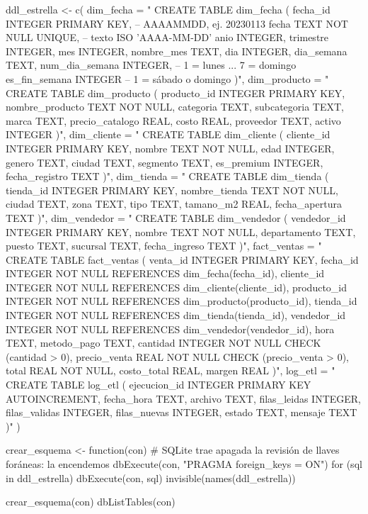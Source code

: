 \begin{rcode}
ddl_estrella <- c(
  dim_fecha = "
    CREATE TABLE dim_fecha (
      fecha_id       INTEGER PRIMARY KEY,  -- AAAAMMDD, ej. 20230113
      fecha          TEXT NOT NULL UNIQUE, -- texto ISO 'AAAA-MM-DD'
      anio           INTEGER, trimestre INTEGER, mes INTEGER,
      nombre_mes     TEXT, dia INTEGER, dia_semana TEXT,
      num_dia_semana INTEGER,              -- 1 = lunes ... 7 = domingo
      es_fin_semana  INTEGER               -- 1 = sábado o domingo
    )",
  dim_producto = "
    CREATE TABLE dim_producto (
      producto_id INTEGER PRIMARY KEY, nombre_producto TEXT NOT NULL,
      categoria TEXT, subcategoria TEXT, marca TEXT,
      precio_catalogo REAL, costo REAL, proveedor TEXT, activo INTEGER
    )",
  dim_cliente = "
    CREATE TABLE dim_cliente (
      cliente_id INTEGER PRIMARY KEY, nombre TEXT NOT NULL,
      edad INTEGER, genero TEXT, ciudad TEXT, segmento TEXT,
      es_premium INTEGER, fecha_registro TEXT
    )",
  dim_tienda = "
    CREATE TABLE dim_tienda (
      tienda_id INTEGER PRIMARY KEY, nombre_tienda TEXT NOT NULL,
      ciudad TEXT, zona TEXT, tipo TEXT, tamano_m2 REAL,
      fecha_apertura TEXT
    )",
  dim_vendedor = "
    CREATE TABLE dim_vendedor (
      vendedor_id INTEGER PRIMARY KEY, nombre TEXT NOT NULL,
      departamento TEXT, puesto TEXT, sucursal TEXT, fecha_ingreso TEXT
    )",
  fact_ventas = "
    CREATE TABLE fact_ventas (
      venta_id     INTEGER PRIMARY KEY,
      fecha_id     INTEGER NOT NULL REFERENCES dim_fecha(fecha_id),
      cliente_id   INTEGER NOT NULL REFERENCES dim_cliente(cliente_id),
      producto_id  INTEGER NOT NULL REFERENCES dim_producto(producto_id),
      tienda_id    INTEGER NOT NULL REFERENCES dim_tienda(tienda_id),
      vendedor_id  INTEGER NOT NULL REFERENCES dim_vendedor(vendedor_id),
      hora TEXT, metodo_pago TEXT,
      cantidad     INTEGER NOT NULL CHECK (cantidad > 0),
      precio_venta REAL    NOT NULL CHECK (precio_venta > 0),
      total REAL NOT NULL, costo_total REAL, margen REAL
    )",
  log_etl = "
    CREATE TABLE log_etl (
      ejecucion_id  INTEGER PRIMARY KEY AUTOINCREMENT,
      fecha_hora    TEXT, archivo TEXT,
      filas_leidas  INTEGER, filas_validas INTEGER,
      filas_nuevas  INTEGER, estado TEXT, mensaje TEXT
    )"
)

crear_esquema <- function(con) {
  # SQLite trae apagada la revisión de llaves foráneas: la encendemos
  dbExecute(con, "PRAGMA foreign_keys = ON")
  for (sql in ddl_estrella) dbExecute(con, sql)
  invisible(names(ddl_estrella))
}

crear_esquema(con)
dbListTables(con)
\end{rcode}

